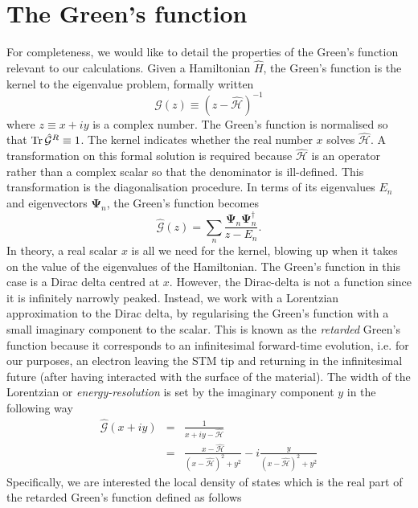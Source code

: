 \chapter{\label{ap:green}The Green's function}
\graphicspath{{}}
For completeness, we would like to detail the properties of the Green's function relevant to our calculations. Given a Hamiltonian $\hat H$, the Green's function is the kernel to the eigenvalue problem, formally written
\begin{equation}
\hat{\mathcal{G}}(z)\equiv\left(z-\hat{\mathcal{H}}\right)^{-1}
\end{equation}
where $z\equiv x+iy$ is a complex number. The Green's function is normalised so that $\operatorname{Tr}\hat{\mathcal{G}}^R\equiv1$. The kernel indicates whether the real number $x$ solves $\hat{\mathcal{H}}$. A transformation on this formal solution is required because $\hat{\mathcal{H}}$ is an operator rather than a complex scalar so that the denominator is ill-defined. This transformation is the diagonalisation procedure. In terms of its eigenvalues $E_n$ and eigenvectors $\bm{\Psi}_n$, the Green's function becomes
\begin{equation}
\hat{\mathcal{G}}(z)=\sum_n\frac{\bm{\Psi}_n\bm{\Psi}_n^\dagger}{z-E_n}.
\end{equation}
In theory, a real scalar $x$ is all we need for the kernel, blowing up when it takes on the value of the eigenvalues of the Hamiltonian. The Green's function in this case is a Dirac delta centred at $x$. However, the Dirac-delta is not a function since it is infinitely narrowly peaked. Instead, we work with a Lorentzian approximation to the Dirac delta, by regularising the Green's function with a small imaginary component to the scalar. This is known as the \textit{retarded} Green's function because it corresponds to an infinitesimal forward-time evolution, i.e. for our purposes, an electron leaving the STM tip and returning in the infinitesimal future (after having interacted with the surface of the material). The width of the Lorentzian or \textit{energy-resolution} is set by the imaginary component $y$ in the following way
\begin{eqnarray}
\hat{\mathcal{G}}(x+iy) &=& \frac{1}{x+iy-\hat{\mathcal{H}}}\\
&=& \frac{x-\hat{\mathcal{H}}}{(x-\hat{\mathcal{H}})^2+y^2}-i\frac{y}{(x-\hat{\mathcal{H}})^2+y^2}
\end{eqnarray}
Specifically, we are interested the local density of states which is the real part of the retarded Green's function defined as follows
